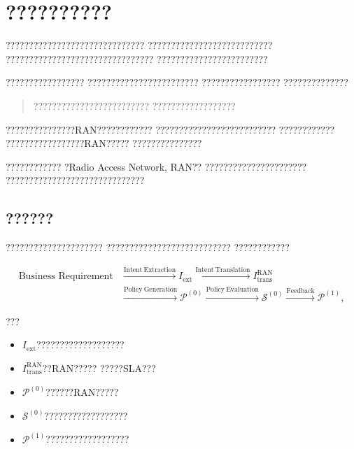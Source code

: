 \chapter{??????????}
\label{chap:intent_driven_decision}

??????????????????????????????
???????????????????????????
????????????????????????????????
????????????????????????

?????????????????
????????????????????????
?????????????????
??????????????

\begin{quote}
?????????????????????????
??????????????????
\end{quote}

???????????????RAN????????????
??????????????????????????
????????????
?????????????????RAN?????
???????????????

????????????
?Radio Access Network, RAN??
??????????????????????
??????????????????????????????


\section{??????}
\label{sec:intent_decision_overview}

?????????????????????
???????????????????????????
????????????

\begin{equation}
\begin{aligned}
\text{Business Requirement}
&\xrightarrow{\mathrm{Intent\ Extraction}}
I_{\mathrm{ext}}
\xrightarrow{\mathrm{Intent\ Translation}}
I_{\mathrm{trans}}^{\mathrm{RAN}}
\\
&\xrightarrow{\mathrm{Policy\ Generation}}
\mathcal{P}^{(0)}
\xrightarrow{\mathrm{Policy\ Evaluation}}
\mathcal{S}^{(0)}
\xrightarrow{\mathrm{Feedback}}
\mathcal{P}^{(1)},
\end{aligned}
\label{eq:intent_decision_pipeline}
\end{equation}

???

\begin{itemize}
    \item $I_{\mathrm{ext}}$???????????????????
    \item $I_{\mathrm{trans}}^{\mathrm{RAN}}$??RAN?????
    ?????SLA???
    \item $\mathcal{P}^{(0)}$??????RAN?????
    \item $\mathcal{S}^{(0)}$??????????????????
    \item $\mathcal{P}^{(1)}$??????????????????
\end{itemize}

